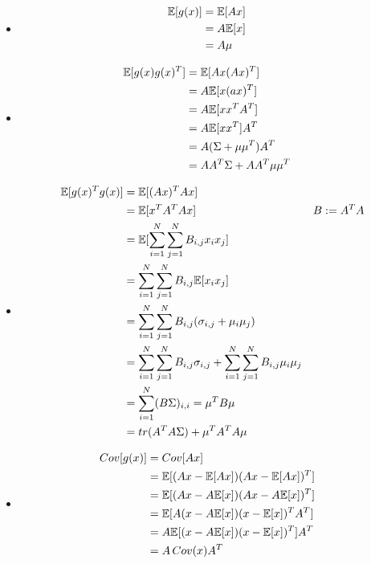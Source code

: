 %
%
\begin{itemize}
  \item
    \begin{align*}
    \mathbb{E}[g(x)] &= \mathbb{E}[Ax] &\\
    &= A\mathbb{E}[x] &\\
    &= A\mu &
  \end{align*}
  \item
    \begin{align*}
      \mathbb{E}[g(x)g(x)^T] &= \mathbb{E}[Ax(Ax)^T] &\\
      &= A \mathbb{E}[x(ax)^T] &\\
      &= A \mathbb{E}[xx^TA^T] &\\
      &= A \mathbb{E}[xx^T] A^T &\\
      &= A(\Sigma + \mu\mu^T)A^T &\\
      &= A A^T \Sigma + AA^T\mu\mu^T&
    \end{align*}
  \item
    \begin{align*}
      \mathbb{E}[g(x)^Tg(x)] &= \mathbb{E}[(Ax)^TAx] &\\
      &= \mathbb{E}[x^TA^TAx] & B := A^TA \\
      &= \mathbb{E}[\sum_{i=1}^N \sum_{j=1}^N B_{i,j} x_i x_j ] & \\
      &= \sum_{i=1}^N \sum_{j=1}^N B_{i,j} \mathbb{E}[x_ix_j] &\\
      &= \sum_{i=1}^N \sum_{j=1}^N B_{i,j} (\sigma_{i,j} + \mu_i \mu_j) &\\
      &= \sum_{i=1}^N \sum_{j=1}^N B_{i,j} \sigma_{i,j} + \sum_{i=1}^N \sum_{j=1}^N B_{i,j} \mu_i \mu_j &\\
      &= \sum_{i=1}^N (B\Sigma)_{i,i} = \mu^T B \mu &\\
      &= tr(A^TA\Sigma) + \mu^TA^TA\mu &
    \end{align*}
  \item
    \begin{align*}
      Cov[g(x)] &= Cov[Ax] &\\
      &= \mathbb{E}[(Ax - \mathbb{E}[Ax])(Ax - \mathbb{E}[Ax])^T] &\\
      &= \mathbb{E}[(Ax - A\mathbb{E}[x])(Ax - A\mathbb{E}[x])^T] &\\
      &= \mathbb{E}[A(x - A\mathbb{E}[x])(x - \mathbb{E}[x])^TA^T] &\\
      &= A\mathbb{E}[(x - A\mathbb{E}[x])(x - \mathbb{E}[x])^T]A^T &\\
      &= A \, Cov(x) A^T &
    \end{align*}
\end{itemize}
%
%



